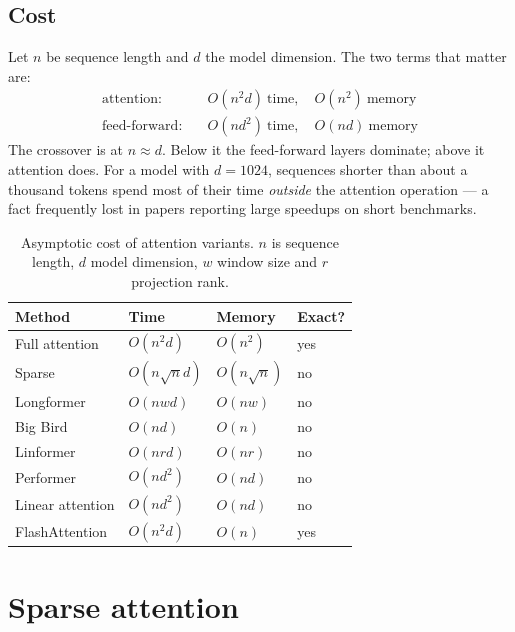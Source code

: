 \documentclass[11pt,a4paper]{article}
\begin{document}
\subsection{Cost}
\label{sec:cost}

Let $n$ be sequence length and $d$ the model dimension. The two terms that
matter are:
\begin{align}
  \text{attention:} \quad & O(n^2 d) \ \text{time}, \quad O(n^2) \ \text{memory} \\
  \text{feed-forward:} \quad & O(n d^2) \ \text{time}, \quad O(nd) \ \text{memory}
\end{align}
The crossover is at $n \approx d$. Below it the feed-forward layers dominate;
above it attention does. For a model with $d = 1024$, sequences shorter than
about a thousand tokens spend most of their time \emph{outside} the attention
operation --- a fact frequently lost in papers reporting large speedups on
short benchmarks.

\begin{table}[htbp]
  \centering
  \caption{Asymptotic cost of attention variants. $n$ is sequence length,
           $d$ model dimension, $w$ window size and $r$ projection rank.}
  \label{tab:complexity}
  \begin{tabular}{llll}
    \toprule
    \textbf{Method} & \textbf{Time} & \textbf{Memory} & \textbf{Exact?} \\
    \midrule
    Full attention \cite{vaswani2017}   & $O(n^2 d)$      & $O(n^2)$   & yes \\
    Sparse \cite{child2019}             & $O(n\sqrt{n}d)$ & $O(n\sqrt{n})$ & no \\
    Longformer \cite{beltagy2020}       & $O(nwd)$        & $O(nw)$    & no \\
    Big Bird \cite{zaheer2020}          & $O(nd)$         & $O(n)$     & no \\
    Linformer \cite{wang2020}           & $O(nrd)$        & $O(nr)$    & no \\
    Performer \cite{choromanski2021}    & $O(nd^2)$       & $O(nd)$    & no \\
    Linear attention \cite{katharopoulos2020} & $O(nd^2)$ & $O(nd)$    & no \\
    FlashAttention \cite{dao2022}       & $O(n^2 d)$      & $O(n)$     & yes \\
    \bottomrule
  \end{tabular}
\end{table}

\section{Sparse attention}
\label{sec:sparse}
\end{document}
